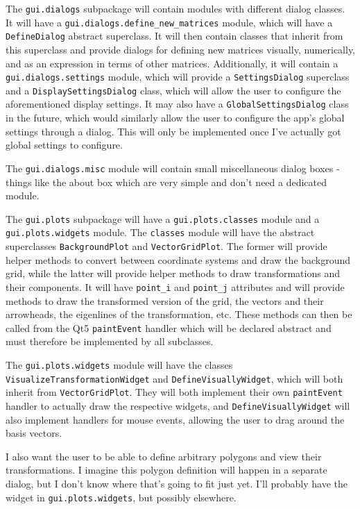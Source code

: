 \documentclass[../main.tex]{subfiles}
\begin{document}
The \texttt{gui.dialogs} subpackage will contain modules with different dialog classes. It will have a \texttt{gui.dialogs.define\_new\_matrices} module, which will have a \texttt{DefineDialog} abstract superclass. It will then contain classes that inherit from this superclass and provide dialogs for defining new matrices visually, numerically, and as an expression in terms of other matrices. Additionally, it will contain a \texttt{gui.dialogs.settings} module, which will provide a \texttt{SettingsDialog} superclass and a \texttt{DisplaySettingsDialog} class, which will allow the user to configure the aforementioned display settings. It may also have a \texttt{GlobalSettingsDialog} class in the future, which would similarly allow the user to configure the app's global settings through a dialog. This will only be implemented once I've actually got global settings to configure.

The \texttt{gui.dialogs.misc} module will contain small miscellaneous dialog boxes - things like the about box which are very simple and don't need a dedicated module.

The \texttt{gui.plots} subpackage will have a \texttt{gui.plots.classes} module and a \texttt{gui.plots.widgets} module. The \texttt{classes} module will have the abstract superclasses \texttt{BackgroundPlot} and \texttt{VectorGridPlot}. The former will provide helper methods to convert between coordinate systems and draw the background grid, while the latter will provide helper methods to draw transformations and their components. It will have \texttt{point\_i} and \texttt{point\_j} attributes and will provide methods to draw the transformed version of the grid, the vectors and their arrowheads, the eigenlines of the transformation, etc. These methods can then be called from the Qt5 \texttt{paintEvent} handler which will be declared abstract and must therefore be implemented by all subclasses.

The \texttt{gui.plots.widgets} module will have the classes \texttt{VisualizeTransformationWidget} and \texttt{DefineVisuallyWidget}, which will both inherit from \texttt{VectorGridPlot}. They will both implement their own \texttt{paintEvent} handler to actually draw the respective widgets, and \texttt{DefineVisuallyWidget} will also implement handlers for mouse events, allowing the user to drag around the basis vectors.

I also want the user to be able to define arbitrary polygons and view their transformations. I imagine this polygon definition will happen in a separate dialog, but I don't know where that's going to fit just yet. I'll probably have the widget in \texttt{gui.plots.widgets}, but possibly elsewhere.
\end{document}
